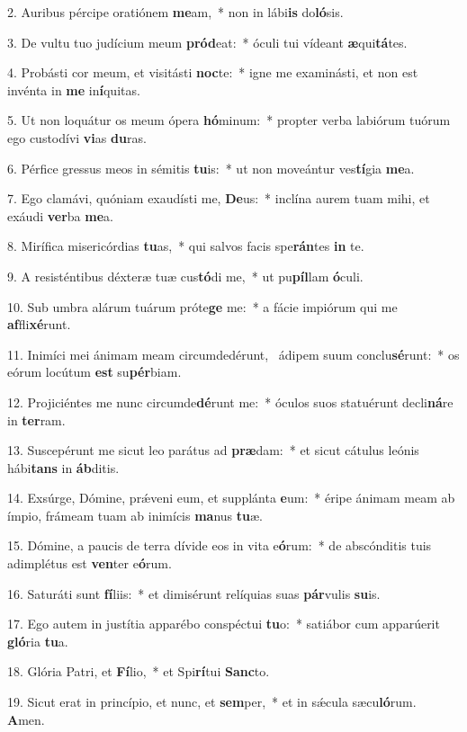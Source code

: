 2. Auribus pércipe oratiónem \textbf{me}am,~*  non in lábi\textbf{is} do\textbf{ló}sis.\

3. De vultu tuo judícium meum \textbf{pród}eat:~*  óculi tui vídeant \textbf{æ}qui\textbf{tá}tes.\

4. Probásti cor meum, et visitásti \textbf{noc}te:~*  igne me examinásti, et non est invénta in \textbf{me} in\textbf{í}quitas.\

5. Ut non loquátur os meum ópera \textbf{hó}minum:~*  propter verba labiórum tuórum ego custodívi \textbf{vi}as \textbf{du}ras.\

6. Pérfice gressus meos in sémitis \textbf{tu}is:~*  ut non moveántur ves\textbf{tí}gia \textbf{me}a.\

7. Ego clamávi, quóniam exaudísti me, \textbf{De}us:~*  inclína aurem tuam mihi, et exáudi \textbf{ver}ba \textbf{me}a.\

8. Mirífica misericórdias \textbf{tu}as,~*  qui salvos facis spe\textbf{rán}tes \textbf{in} te.\

9. A resisténtibus déxteræ tuæ cus\textbf{tó}di me,~*  ut pu\textbf{píl}lam \textbf{ó}culi.\

10. Sub umbra alárum tuárum próte\textbf{ge} me:~*  a fácie impiórum qui me \textbf{af}fli\textbf{xé}runt.\

11. Inimíci mei ánimam meam circumdedérunt, \dag\  ádipem suum conclu\textbf{sé}runt:~*  os eórum locútum \textbf{est} su\textbf{pér}biam.\

12. Projiciéntes me nunc circumde\textbf{dé}runt me:~*  óculos suos statuérunt decli\textbf{ná}re in \textbf{ter}ram.\

13. Suscepérunt me sicut leo parátus ad \textbf{præ}dam:~*  et sicut cátulus leónis hábi\textbf{tans} in \textbf{áb}ditis.\

14. Exsúrge, Dómine, prǽveni eum, et supplánta \textbf{e}um:~*  éripe ánimam meam ab ímpio, frámeam tuam ab inimícis \textbf{ma}nus \textbf{tu}æ.\

15. Dómine, a paucis de terra dívide eos in vita e\textbf{ó}rum:~*  de abscónditis tuis adimplétus est \textbf{ven}ter e\textbf{ó}rum.\

16. Saturáti sunt \textbf{fí}liis:~*  et dimisérunt relíquias suas \textbf{pár}vulis \textbf{su}is.\

17. Ego autem in justítia apparébo conspéctui \textbf{tu}o:~*  satiábor cum apparúerit \textbf{gló}ria \textbf{tu}a.\

18. Glória Patri, et \textbf{Fí}lio,~*  et Spi\textbf{rí}tui \textbf{Sanc}to.\

19. Sicut erat in princípio, et nunc, et \textbf{sem}per,~*  et in sǽcula sæcu\textbf{ló}rum. \textbf{A}men.\

